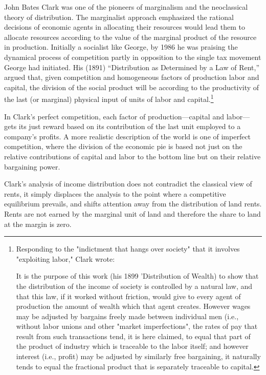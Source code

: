  John Bates Clark was one of the pioneers of marginalism and the neoclassical theory of  distribution.  The marginalist approach emphasized the rational decisions of economic agents in allocating their resources would lead them to allocate resources according to the value of the marginal product of the resource in production.  Initially a socialist like George, by 1986 he was praising the dynamical process of competition partly in opposition to the single tax movement George had initiated.  His (1891) ``Distribution as Determined by a Law of Rent,'' argued that, given  competition and homogeneous factors of production labor and capital, the division of the social product will be according to the productivity of the last (or marginal) physical input of units of labor and capital.\footnote{Responding to the "indictment that hangs over society" that it involves "exploiting labor," Clark wrote:

    It is the purpose of this work (his 1899 'Distribution of Wealth) to show that the distribution of the income of society is controlled by a natural law, and that this law, if it worked without friction, would give to every agent of production the amount of wealth which that agent creates. However wages may be adjusted by bargains freely made between individual men (i.e., without labor unions and other "market imperfections", the rates of pay that result from such transactions tend, it is here claimed, to equal that part of the product of industry which is traceable to the labor itself; and however interest (i.e., profit) may be adjusted by similarly free bargaining, it naturally tends to equal the fractional product that is separately traceable to capital.} 

 In Clark's  perfect competition, each factor of production—capital and labor—gets its just reward based on its contribution of  the last unit employed to a company’s profits. A more realistic description of the world is one of imperfect competition, where the division of the economic pie is based not just on the relative contributions of capital and labor to the bottom line but on their relative bargaining power. 
 
Clark's analysis of income distribution does not contradict the classical view of rents, it simply displaces the analysis to the point where a competitive equilibrium prevails, and shifts attention away from the distribution of land rents. Rents are not earned by the marginal unit of land and therefore the share to land at the margin is zero. 



